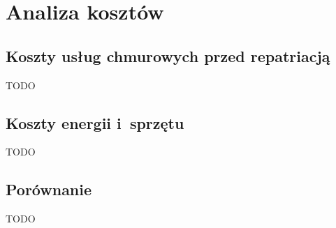 \chapter{Analiza kosztów}

\section{Koszty usług chmurowych przed repatriacją}
TODO

\section{Koszty energii i~sprzętu}
TODO

\section{Porównanie}
TODO
